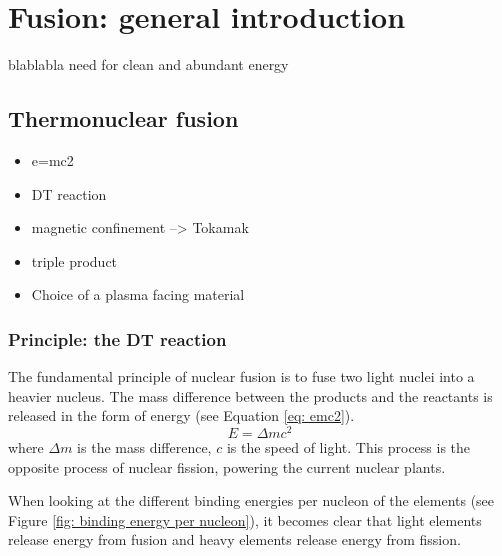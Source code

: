 \setchapterpreamble[u]{\margintoc}
\chapter{Fusion: general introduction}\label{Chapter1}

blablabla need for clean and abundant energy

\section{Thermonuclear fusion}
\begin{itemize}
    \item e=mc2
    \item DT reaction
    \item magnetic confinement --> Tokamak
    \item triple product
    \item Choice of a plasma facing material
\end{itemize}

\subsection{Principle: the DT reaction}

The fundamental principle of nuclear fusion is to fuse two light nuclei into a heavier nucleus.
The mass difference between the products and the reactants is released in the form of energy (see Equation \ref{eq: emc2}).
\begin{equation}
    E = \Delta m c^2
    \label{eq: emc2}
\end{equation}
where $\Delta m$ is the mass difference, $c$ is the speed of light.
This process is the opposite process of nuclear fission, powering the current nuclear plants.

When looking at the different binding energies per nucleon of the elements (see Figure \ref{fig: binding energy per nucleon}), it becomes clear that light elements release energy from fusion and heavy elements release energy from fission.

